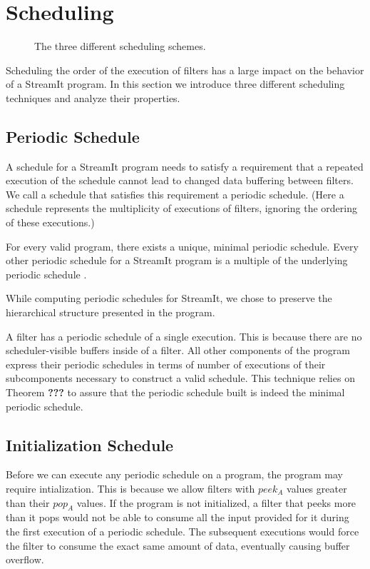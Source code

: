 \section{Scheduling}

\begin{figure}
\centering
{}
\caption{The three different scheduling schemes.}
\label{fig:sched}

\end{figure}

Scheduling the order of the execution of filters has a large impact on 
the behavior of a StreamIt program.  In this section we introduce three
different scheduling techniques and analyze their properties.

\subsection{Periodic Schedule}
A schedule for a StreamIt program needs to satisfy a requirement that
a repeated execution of the schedule cannot lead to changed data
buffering between filters.  We call a schedule that satisfies this
requirement a periodic schedule.  (Here a schedule represents the
multiplicity of executions of filters, ignoring the ordering of these
executions.)

For every valid program, there exists a unique, minimal periodic
schedule.  Every other periodic schedule for a StreamIt program is a
multiple of the underlying periodic schedule \cite{bhat1994x3}.

While computing periodic schedules for StreamIt, we chose to preserve the
hierarchical structure presented in the program.

A filter has a periodic schedule of a single execution.  This is
because there are no scheduler-visible buffers inside of a filter.
All other components of the program express their periodic schedules
in terms of number of executions of their subcomponents necessary to
construct a valid schedule.  This technique relies on Theorem {\bf
???} to assure that the periodic schedule built is indeed the minimal
periodic schedule.

\subsection{Initialization Schedule}

Before we can execute any periodic schedule on a program, the program
may require intialization.  This is because we allow filters with
$peek_A$ values greater than their $pop_A$ values.  If the program is
not initialized, a filter that peeks more than it pops would not be
able to consume all the input provided for it during the first
execution of a periodic schedule.  The subsequent executions would
force the filter to consume the exact same amount of data, eventually
causing buffer overflow.

